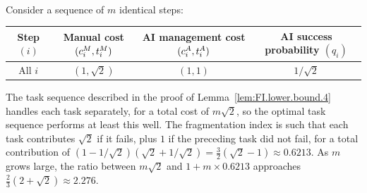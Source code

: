 \documentclass[12pt, final]{article}
\begin{document}
\\[-0.2em]
\noindent{\color{black!25}\rule{\linewidth}{0.4pt}}\par\vspace{1em}
\renewcommand\theexample{OA-\arabic{example}}
\setcounter{example}{1}
\begin{example}
\label{ex:FI.lower.gap}
Consider a sequence of $m$ identical steps:
\begin{center}
\begin{tabular}{c|ccc}
\toprule
\makecell{Step\\$(i)$} & \makecell{Manual cost\\$(c^{M}_{i}, t^{M}_{i})$} & \makecell{AI management cost\\$(c^{A}_{i}, t^{A}_{i})$} & \makecell{AI success probability\\$(q_i)$} \\
\midrule
All $i$ & $(1, \sqrt{2})$ & $(1, 1)$ & $1/\sqrt{2}$ \\
\bottomrule
\end{tabular}
\end{center}
The task sequence described in the proof of Lemma~\ref{lem:FI.lower.bound.4} handles each task separately, for a total cost of $m \sqrt{2}$, so the optimal task sequence performs at least this well.
The fragmentation index is such that each task contributes $\sqrt{2}$ if it fails, plus $1$ if the preceding task did not fail, for a total contribution of $(1-1/\sqrt{2})(\sqrt{2} + 1/\sqrt{2}) = \tfrac{3}{2}(\sqrt{2}-1) \approx 0.6213$.
As $m$ grows large, the ratio between $m\sqrt{2}$ and $1 + m \times 0.6213$ approaches $\tfrac{2}{3}(2+\sqrt{2}) \approx 2.276$.
\end{example}
\clearpage
\end{document}
